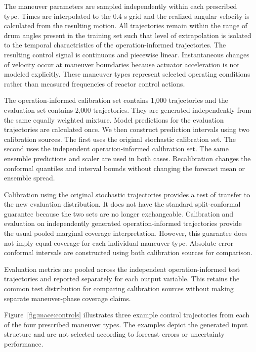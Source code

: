 The maneuver parameters are sampled independently within each prescribed type. Times are interpolated to the 0.4 s grid and the realized angular velocity is calculated from the resulting motion. All trajectories remain within the range of drum angles present in the training set such that level of extrapolation is isolated to the temporal charactristics of the operation-informed trajectories. The resulting control signal is continuous and piecewise linear. Instantaneous changes of velocity occur at maneuver boundaries because actuator acceleration is not modeled explicitly. These maneuver types represent selected operating conditions rather than measured frequencies of reactor control actions.

The operation-informed calibration set contains 1{,}000 trajectories and the evaluation set contains 2{,}000 trajectories. They are generated independently from the same equally weighted mixture. Model predictions for the evaluation trajectories are calculated once. We then construct prediction intervals using two calibration sources. The first uses the original stochastic calibration set. The second uses the independent operation-informed calibration set. The same ensemble predictions and scaler are used in both cases. Recalibration changes the conformal quantiles and interval bounds without changing the forecast mean or ensemble spread.

Calibration using the original stochastic trajectories provides a test of transfer to the new evaluation distribution. It does not have the standard split-conformal guarantee because the two sets are no longer exchangeable. Calibration and evaluation on independently generated operation-informed trajectories provide the usual pooled marginal coverage interpretation. However, this guarantee does not imply equal coverage for each individual maneuver type. Absolute-error conformal intervals are constructed using both calibration sources for comparison.

Evaluation metrics are pooled across the independent operation-informed test trajectories and reported separately for each output variable. This retains the common test distribution for comparing calibration sources without making separate maneuver-phase coverage claims.

Figure~\ref{fig:mace:controls} illustrates three example control trajectories from each of the four prescribed maneuver types. The examples depict the generated input structure and are not selected according to forecast errors or uncertainty performance.

